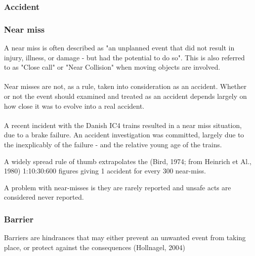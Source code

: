 \subsubsection*{Accident}

\subsubsection*{Near miss}
\label{sec:near_miss}
A near miss is often described as "an unplanned event that did not result in injury, illness, or damage - but had the potential to do so". This is also referred to as "Close call" or "Near Collision" when moving objects are involved.\\
\\
Near misses are not, as a rule, taken into consideration as an accident. Whether or not the event should examined and treated as an accident depends largely on how close it was to evolve into a real accident.\\
\\
A recent incident with the Danish IC4 trains resulted in a near miss situation, due to a brake failure. An accident investigation was committed, largely due to the inexplicably of the failure - and the relative young age of the trains.

A widely spread rule of thumb extrapolates the (Bird, 1974; from Heinrich et Al., 1980) 1:10:30:600 figures giving 1 accident for every 300 near-miss.

A problem with near-misses is they are rarely reported and unsafe acts are considered never reported.

\subsubsection*{Barrier}
\label{sec:barrier}
Barriers are hindrances that may either prevent an unwanted event from taking place, or protect against the consequences (Hollnagel, 2004)

